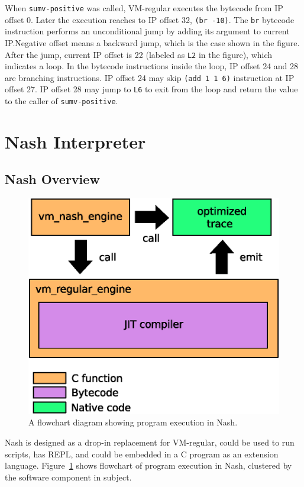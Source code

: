 \documentclass[preprint, 10pt]{sigplanconf}
\begin{document}
When \texttt{sumv-positive} was called, VM-regular executes the bytecode from
IP offset 0. Later the execution reaches to IP offset 32, \texttt{(br
  -10)}. The \texttt{br} bytecode instruction performs an unconditional jump
by adding its argument to current IP.\@ Negative offset means a backward jump,
which is the case shown in the figure. After the jump, current IP offset is 22
(labeled as \texttt{L2} in the figure), which indicates a loop. In the
bytecode instructions inside the loop, IP offset 24 and 28 are branching
instructions. IP offset 24 may skip \texttt{(add 1 1 6)} instruction at IP
offset 27. IP offset 28 may jump to \texttt{L6} to exit from the loop and
return the value to the caller of \texttt{sumv-positive}.

\section{Nash Interpreter}
\label{sec:interpreter}

\subsection{Nash Overview}
\label{sec:overview}

\begin{figure}
  \centering
  \includegraphics[width=0.45 \textwidth]{overview}
  \caption{A flowchart diagram showing program execution in Nash.}
\label{fig:overview}
\end{figure}

Nash is designed as a drop-in replacement for VM-regular, could be used to run
scripts, has REPL, and could be embedded in a C program as an extension
language. Figure~\hyperref[fig:overview]{\ref{fig:overview}} shows flowchart
of program execution in Nash, clustered by the software component in
subject.
\end{document}
